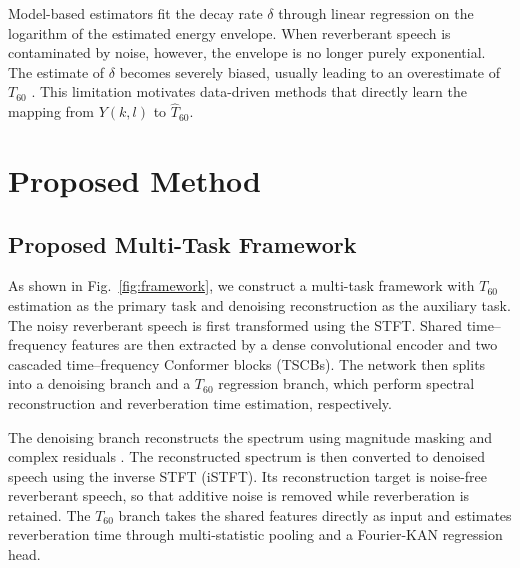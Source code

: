 \documentclass[a4paper,fleqn]{cas-sc}
\begin{document}


Model-based estimators fit the decay rate $\delta$ through linear regression on the logarithm of the estimated energy envelope. When reverberant speech is contaminated by noise, however, the envelope is no longer purely exponential. The estimate of $\delta$ becomes severely biased, usually leading to an overestimate of $T_{60}$ \citep{gaubitch2012comparison}. This limitation motivates data-driven methods that directly learn the mapping from $Y(k,l)$ to $\hat{T}_{60}$.



\section{Proposed Method}
\label{sec:proposed}



\subsection{Proposed Multi-Task Framework}
\label{sec:framework}



As shown in Fig.~\ref{fig:framework}, we construct a multi-task framework with $T_{60}$ estimation as the primary task and denoising reconstruction as the auxiliary task. The noisy reverberant speech is first transformed using the STFT. Shared time--frequency features are then extracted by a dense convolutional encoder and two cascaded time--frequency Conformer blocks (TSCBs). The network then splits into a denoising branch and a $T_{60}$ regression branch, which perform spectral reconstruction and reverberation time estimation, respectively.



The denoising branch reconstructs the spectrum using magnitude masking and complex residuals \citep{cao2022cmgan}. The reconstructed spectrum is then converted to denoised speech using the inverse STFT (iSTFT). Its reconstruction target is noise-free reverberant speech, so that additive noise is removed while reverberation is retained. The $T_{60}$ branch takes the shared features directly as input and estimates reverberation time through multi-statistic pooling and a Fourier-KAN regression head.
\end{document}
